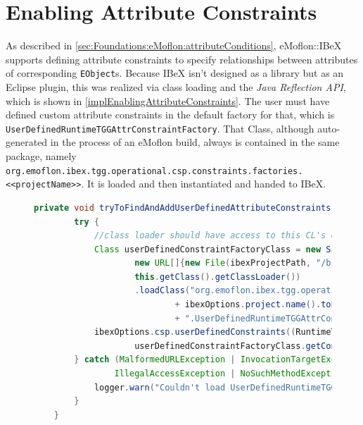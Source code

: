 \section{Enabling Attribute Constraints}
\label{sec:Implementation:EnablingAttributeConstraints}
As described in \autoref{sec:Foundations:eMoflon:attributeConditions}, eMoflon::IBeX supports defining attribute constraints to specify relationships between attributes of corresponding \texttt{EObject}s.
Because IBeX isn't designed as a library but as an Eclipse plugin, this was realized via class loading and the \emph{Java Reflection API}, which is shown in \autoref{implEnablingAttributeConstraints}.
The user must have defined custom attribute constraints in the default factory for that, which is \newline\texttt{UserDefinedRuntimeTGGAttrConstraintFactory}. That Class, although auto-generated in the process of an eMoflon build, always is contained in the same package, namely\newline
\texttt{org.emoflon.ibex.tgg.operational.csp.constraints.factories.<<projectName>>}. \newline
It is loaded and then instantiated and handed to IBeX.


\begin{figure}
    \centering
    \begin{lstlisting}[language=java, caption={Enabling Attribute Constraints in \texttt{VitruviusTGGChangePropagationRegistrationHelper}}, captionpos=b, label=implEnablingAttributeConstraints]
    private void tryToFindAndAddUserDefinedAttributeConstraints(IbexOptions ibexOptions) {
        try {
            //class loader should have access to this CL's classes as well as the ibex project
            Class userDefinedConstraintFactoryClass = new SimpleNameSupportingURLClassLoader(
                    new URL[]{new File(ibexProjectPath, "/bin").toURI().toURL()},
                    this.getClass().getClassLoader())
                    .loadClass("org.emoflon.ibex.tgg.operational.csp.constraints.factories." 
                            + ibexOptions.project.name().toLowerCase() 
                            + ".UserDefinedRuntimeTGGAttrConstraintFactory");
            ibexOptions.csp.userDefinedConstraints((RuntimeTGGAttrConstraintFactory)    
                    userDefinedConstraintFactoryClass.getConstructor().newInstance());
        } catch (MalformedURLException | InvocationTargetException | InstantiationException | 
                IllegalAccessException | NoSuchMethodException e) {
            logger.warn("Couldn't load UserDefinedRuntimeTGGAttrConstraintFactory");
        }
    }
    \end{lstlisting}
\end{figure}


